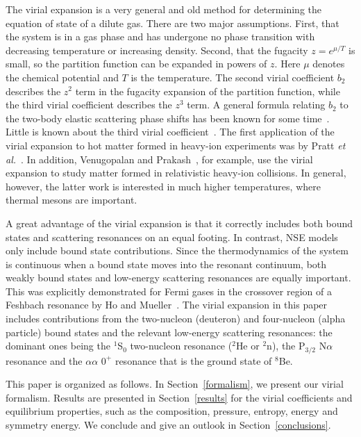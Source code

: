 \documentclass[aps,prc,twocolumn,showpacs,showkeys,amsmath,amssymb]{revtex4}
\begin{document}
The virial expansion is a very general and old method for determining 
the equation of state of a dilute gas.  There are two major assumptions.  
First, that the system is in a gas phase and has undergone no phase 
transition with decreasing temperature or increasing density.  
Second, that the fugacity 
$z = e^{\mu/T}$ is small, so the partition function can be expanded 
in powers of $z$.  Here $\mu$ denotes the chemical potential and $T$ 
is the temperature.  The second virial coefficient $b_2$ describes 
the $z^2$ term in the fugacity
expansion of the partition function, while the 
third virial coefficient describes the $z^3$ term.  A general formula 
relating $b_2$ to the two-body elastic scattering phase shifts has been 
known for some time~\cite{b2}.  Little is known about the third virial 
coefficient~\cite{b3Pais,b3Bedaque}. The first application of the
virial expansion to hot matter formed in heavy-ion experiments was
by Pratt {\it et al.}~\cite{Pratt}. In addition, Venugopalan and 
Prakash~\cite{Venugo}, for example, use the 
virial expansion to study matter formed in relativistic heavy-ion 
collisions. In general, however, the latter work is interested in 
much higher temperatures, where thermal mesons are important.

A great advantage of the virial expansion 
is that it correctly includes both bound states and scattering 
resonances on an equal footing.  In contrast, NSE models only include 
bound state contributions.  Since the thermodynamics of the system is
continuous when a bound state moves into the resonant continuum, 
both weakly bound states and low-energy scattering resonances are 
equally important. This was explicitly demonstrated for
Fermi gases in the crossover region of a Feshbach resonance by Ho
and Mueller~\cite{Ho1}. The virial expansion in this paper includes 
contributions from the two-nucleon (deuteron) and four-nucleon 
(alpha particle) bound states and the relevant low-energy scattering 
resonances: the dominant ones being the $^1$S$_0$ two-nucleon resonance 
($^2$He or $^2$n), the P$_{3/2}$ N$\alpha$ resonance and the 
$\alpha\alpha$ $0^+$ resonance that is the ground state of $^8$Be.

This paper is organized as follows.  In Section~\ref{formalism}, we 
present our virial formalism.  Results are presented in 
Section~\ref{results} for the virial coefficients and
equilibrium properties, such as the composition, pressure, entropy, 
energy and symmetry energy.  We conclude and give an outlook in 
Section~\ref{conclusions}.   
\end{document}
